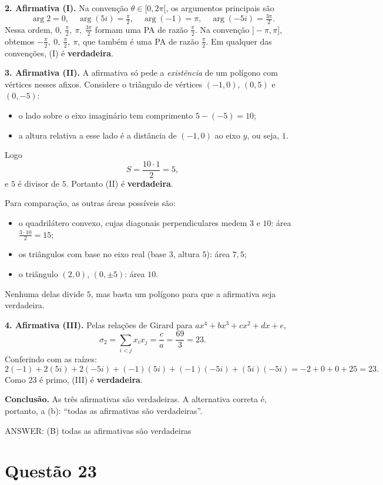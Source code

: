 \documentclass{article}%
\begin{document}
\textbf{2. Afirmativa (I).} Na convenção $\theta\in[0,2\pi[$, os argumentos principais são
\[
\arg 2=0,\quad \arg(5i)=\tfrac{\pi}{2},\quad \arg(-1)=\pi,\quad \arg(-5i)=\tfrac{3\pi}{2}.
\]
Nessa ordem, $0,\ \tfrac{\pi}{2},\ \pi,\ \tfrac{3\pi}{2}$ formam uma PA de razão $\tfrac{\pi}{2}$. Na convenção $]-\pi,\pi]$, obtemos $-\tfrac{\pi}{2},\ 0,\ \tfrac{\pi}{2},\ \pi$, que também é uma PA de razão $\tfrac{\pi}{2}$. Em qualquer das convenções, (I) é \textbf{verdadeira}.

\textbf{3. Afirmativa (II).} A afirmativa só pede a \emph{existência} de um polígono com vértices nesses afixos. Considere o triângulo de vértices $(-1,0)$, $(0,5)$ e $(0,-5)$:
\begin{itemize}
\item o lado sobre o eixo imaginário tem comprimento $5-(-5)=10$;
\item a altura relativa a esse lado é a distância de $(-1,0)$ ao eixo $y$, ou seja, $1$.
\end{itemize}
Logo
\[
S=\frac{10\cdot 1}{2}=5,
\]
e $5$ é divisor de $5$. Portanto (II) é \textbf{verdadeira}.

Para comparação, as outras áreas possíveis são:
\begin{itemize}
\item o quadrilátero convexo, cujas diagonais perpendiculares medem $3$ e $10$: área $\tfrac{3\cdot 10}{2}=15$;
\item os triângulos com base no eixo real (base $3$, altura $5$): área $7{,}5$;
\item o triângulo $(2,0)$, $(0,\pm 5)$: área $10$.
\end{itemize}
Nenhuma delas divide $5$, mas basta um polígono para que a afirmativa seja verdadeira.

\textbf{4. Afirmativa (III).} Pelas relações de Girard para $ax^4+bx^3+cx^2+dx+e$,
\[
\sigma_2=\sum_{i<j}x_ix_j=\frac{c}{a}=\frac{69}{3}=23.
\]
Conferindo com as raízes:
\[
2(-1)+2(5i)+2(-5i)+(-1)(5i)+(-1)(-5i)+(5i)(-5i)=-2+0+0+25=23.
\]
Como $23$ é primo, (III) é \textbf{verdadeira}.

\textbf{Conclusão.} As três afirmativas são verdadeiras. A alternativa correta é, portanto, a (b): ``todas as afirmativas são verdadeiras''.

ANSWER: (B) todas as afirmativas são verdadeiras%
\newpage%
\section*{Questão 23}
\end{document}
